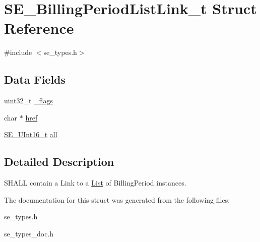 \hypertarget{structSE__BillingPeriodListLink__t}{}\section{S\+E\+\_\+\+Billing\+Period\+List\+Link\+\_\+t Struct Reference}
\label{structSE__BillingPeriodListLink__t}


{\ttfamily \#include $<$se\+\_\+types.\+h$>$}

\subsection*{Data Fields}
\begin{DoxyCompactItemize}
\item 
uint32\+\_\+t \hyperlink{group__BillingPeriodListLink_ga7caa40e6d3c99533fb043c648b6622a4}{\+\_\+flags}
\item 
char $\ast$ \hyperlink{group__BillingPeriodListLink_gaa205c380cc70507b95b3e88d00f99a15}{href}
\item 
\hyperlink{group__UInt16_gac68d541f189538bfd30cfaa712d20d29}{S\+E\+\_\+\+U\+Int16\+\_\+t} \hyperlink{group__BillingPeriodListLink_ga6f46995c2700dabe61ac54cc90275c58}{all}
\end{DoxyCompactItemize}


\subsection{Detailed Description}
S\+H\+A\+LL contain a Link to a \hyperlink{structList}{List} of Billing\+Period instances. 

The documentation for this struct was generated from the following files\+:\begin{DoxyCompactItemize}
\item 
se\+\_\+types.\+h\item 
se\+\_\+types\+\_\+doc.\+h\end{DoxyCompactItemize}
